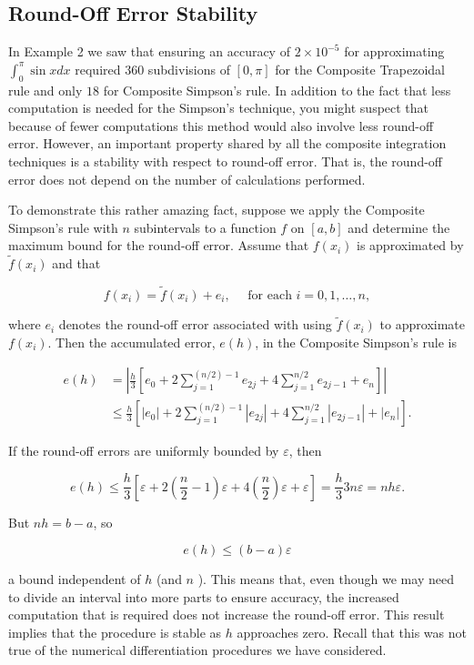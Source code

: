 \documentclass[12pt,a4paper]{article}
\begin{document}
\subsection*{Round-Off Error Stability}
In Example 2 we saw that ensuring an accuracy of $2 \times 10^{-5}$ for approximating $\int_{0}^{\pi} \sin x d x$ required $360$ subdivisions of $[0, \pi]$ for the Composite Trapezoidal rule and only $18$ for Composite Simpson's rule. In addition to the fact that less computation is needed for the Simpson's technique, you might suspect that because of fewer computations this method would also involve less round-off error. However, an important property shared by all the composite integration techniques is a stability with respect to round-off error. That is, the round-off error does not depend on the number of calculations performed.

To demonstrate this rather amazing fact, suppose we apply the Composite Simpson's rule with $n$ subintervals to a function $f$ on $[a, b]$ and determine the maximum bound for the round-off error. Assume that $f\left(x_{i}\right)$ is approximated by $\tilde{f}\left(x_{i}\right)$ and that

$$
f\left(x_{i}\right)=\tilde{f}\left(x_{i}\right)+e_{i}, \quad \text { for each } i=0,1, \ldots, n,
$$

where $e_{i}$ denotes the round-off error associated with using $\tilde{f}\left(x_{i}\right)$ to approximate $f\left(x_{i}\right)$. Then the accumulated error, $e(h)$, in the Composite Simpson's rule is

$$
\begin{aligned}
e(h) & =\left|\frac{h}{3}\left[e_{0}+2 \sum_{j=1}^{(n / 2)-1} e_{2 j}+4 \sum_{j=1}^{n / 2} e_{2 j-1}+e_{n}\right]\right| \\
& \leq \frac{h}{3}\left[\left|e_{0}\right|+2 \sum_{j=1}^{(n / 2)-1}\left|e_{2 j}\right|+4 \sum_{j=1}^{n / 2}\left|e_{2 j-1}\right|+\left|e_{n}\right|\right] .
\end{aligned}
$$

If the round-off errors are uniformly bounded by $\varepsilon$, then

$$
e(h) \leq \frac{h}{3}\left[\varepsilon+2\left(\frac{n}{2}-1\right) \varepsilon+4\left(\frac{n}{2}\right) \varepsilon+\varepsilon\right]=\frac{h}{3} 3 n \varepsilon=n h \varepsilon .
$$

But $n h=b-a$, so

$$
e(h) \leq(b-a) \varepsilon
$$

a bound independent of $h$ (and $n$ ). This means that, even though we may need to divide an interval into more parts to ensure accuracy, the increased computation that is required does not increase the round-off error. This result implies that the procedure is stable as $h$ approaches zero. Recall that this was not true of the numerical differentiation procedures we have considered.
\end{document}
